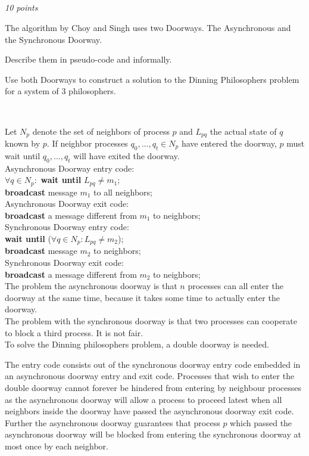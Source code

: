 \documentclass[a4paper]{article}
\newcommand{\points}[1]{\subsection{} \textit{#1 points}\\}
\newcommand{\question}[2][]{
  \parbox[t]{\textwidth}{
    \ifthenelse{\equal{#1}{}}{}{#1)}
    \parbox[t]{0.95\textwidth}{#2}}\\}
\newcommand{\solution}[2][]{
  \ifthenelse{\equal{#1}{} \or \equal{#1}{a}}{\\[3pt]\textit{Solution: }\\[0.1cm]}{}
  \parbox[t]{\textwidth}{
    \ifthenelse{\equal{#1}{}}{}{#1)}
    \parbox[t]{0.95\textwidth}{#2}}\\
}
\begin{document}
\points{10}
\question{
  The algorithm by Choy and Singh uses two Doorways. The Asynchronous
  and the Synchronous Doorway.

  Describe them in pseudo-code and informally.

  Use both Doorways to construct a solution to the Dinning
  Philosophers problem for a system of 3 philosophers.
}
\solution{
  Let $N_p$ denote the set of neighbors of process $p$ and $L_{pq}$
  the actual state of $q$ known by $p$. If neighbor processes
  $q_0,...,q_t \in N_p$ have entered the doorway, $p$ must wait until
  $q_0,...,q_t$ will have exited the doorway.\\[0.1cm]

  Asynchronous Doorway entry code:\\
  $\forall q \in N_p:$ \textbf{wait until} $L_{pq} \neq m_1$;\\
  \textbf{broadcast} message $m_1$ to all neighbors;\\[0.1cm]

  Asynchronous Doorway exit code:\\
  \textbf{broadcast} a message different from $m_1$ to neighbors;\\[0.1cm]

  Synchronous Doorway entry code:\\
  \textbf{wait until} ($\forall q \in N_p: L_{pq} \neq m_2$);\\
  \textbf{broadcast} message $m_2$ to neighbors;\\[0.1cm]

  Synchronous Doorway exit code:\\
  \textbf{broadcast} a message different from $m_2$ to neighbors;\\[0.1cm]

  The problem the asynchronous doorway is that $n$ processes can all
  enter the doorway at the same time, because it takes some time to
  actually enter the doorway.\\[0.1cm]

  The problem with the synchronous doorway is that two processes can
  cooperate to block a third process. It is not fair.\\[0.1cm]

  To solve the Dinning philosophers problem, a double doorway is
  needed.

  The entry code consists out of the synchronous doorway entry code
  embedded in an asynchronous doorway entry and exit code. Processes
  that wish to enter the double doorway cannot forever be hindered from
  entering by neighbour processes as the asynchronous doorway will allow
  a process to proceed latest when all neighbors inside the doorway
  have passed the asynchronous doorway exit code. Further the
  asynchronous doorway guarantees that process $p$ which passed the
  asynchronous doorway will be blocked from entering the synchronous
  doorway at most once by each neighbor.

}
\end{document}
